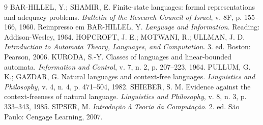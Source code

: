 \documentclass[11pt,a4paper]{article}
\begin{document}
\begin{thebibliography}{9}
 BAR-HILLEL, Y.; SHAMIR, E. Finite-state languages: formal representations and adequacy problems. \emph{Bulletin of the Research Council of Israel}, v. 8F, p. 155--166, 1960. Reimpresso em BAR-HILLEL, Y. \emph{Language and Information}. Reading: Addison-Wesley, 1964.
 HOPCROFT, J. E.; MOTWANI, R.; ULLMAN, J. D. \emph{Introduction to Automata Theory, Languages, and Computation}. 3. ed. Boston: Pearson, 2006.
 KURODA, S.-Y. Classes of languages and linear-bounded automata. \emph{Information and Control}, v. 7, n. 2, p. 207--223, 1964.
 PULLUM, G. K.; GAZDAR, G. Natural languages and context-free languages. \emph{Linguistics and Philosophy}, v. 4, n. 4, p. 471--504, 1982.
 SHIEBER, S. M. Evidence against the context-freeness of natural language. \emph{Linguistics and Philosophy}, v. 8, n. 3, p. 333--343, 1985.
 SIPSER, M. \emph{Introdução à Teoria da Computação}. 2. ed. São Paulo: Cengage Learning, 2007.
\end{thebibliography}
\end{document}
